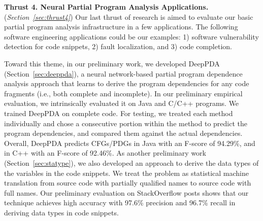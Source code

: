 \vspace{3pt}
\noindent \textbf{Thrust 4. Neural Partial Program Analysis
  Applications.}  ({\em Section~\ref{sec:thrust4}}) Our last thrust of research
is aimed to evaluate our basic partial program analysis infrastructure
in a few applications. The following software engineering
applications could be our examples: 1) software vulnerability detection for code snippets,
2) fault localization, and 3) code completion.





Toward this theme, in our preliminary work, we developed DeepPDA
(Section~\ref{sec:deeppda}), a neural network-based partial program
dependence analysis approach that learns to derive the program
dependencies for any code fragments (i.e., both complete and
incomplete). In our preliminary empirical evaluation, we intrinsically
evaluated it on Java and C/C++ programs. We trained DeepPDA on
complete code. For testing, we treated each method individually and
chose a consecutive portion within the method to predict the program
dependencies, and compared them against the actual
dependencies. Overall, DeepPDA predicts CFGs/PDGs in Java with
an F-score of 94.29\%, and in C++ with an F-score of 92.46\%. As
another preliminary work (Section~\ref{sec:statype}), we also
developed an approach to derive the data types of the variables in the
code snippets. We treat the problem as statistical machine translation
from source code with partially qualified names to source code with
full names. Our preliminary evaluation on StackOverflow posts shows
that our technique achieves high accuracy with 97.6\% precision and
96.7\% recall in deriving data types in code snippets.
